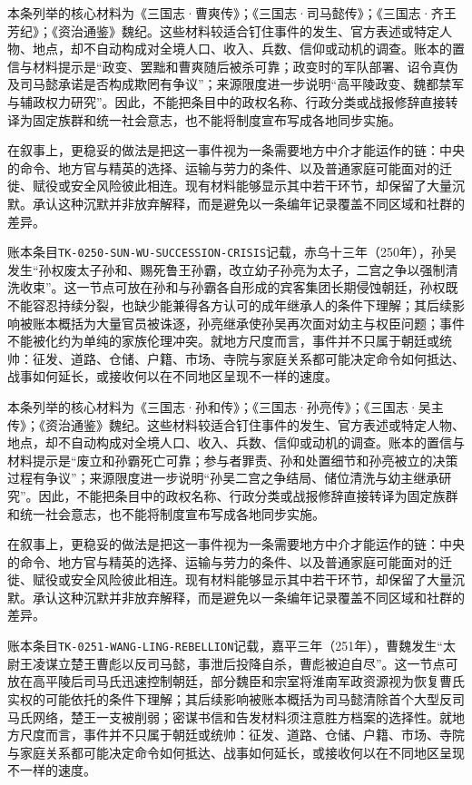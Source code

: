 本条列举的核心材料为《三国志·曹爽传》；《三国志·司马懿传》；《三国志·齐王芳纪》；《资治通鉴》魏纪。这些材料较适合钉住事件的发生、官方表述或特定人物、地点，却不自动构成对全境人口、收入、兵数、信仰或动机的调查。账本的置信与材料提示是“政变、罢黜和曹爽随后被杀可靠；政变时的军队部署、诏令真伪及司马懿承诺是否构成欺罔有争议”；来源限度进一步说明“高平陵政变、魏都禁军与辅政权力研究”。因此，不能把条目中的政权名称、行政分类或战报修辞直接转译为固定族群和统一社会意志，也不能将制度宣布写成各地同步实施。

在叙事上，更稳妥的做法是把这一事件视为一条需要地方中介才能运作的链：中央的命令、地方官与精英的选择、运输与劳力的条件、以及普通家庭可能面对的迁徙、赋役或安全风险彼此相连。现有材料能够显示其中若干环节，却保留了大量沉默。承认这种沉默并非放弃解释，而是避免以一条编年记录覆盖不同区域和社群的差异。

账本条目\texttt{TK-0250-SUN-WU-SUCCESSION-CRISIS}记载，赤乌十三年（250年），孙吴发生“孙权废太子孙和、赐死鲁王孙霸，改立幼子孙亮为太子，二宫之争以强制清洗收束”。这一节点可放在孙和与孙霸各自形成的宾客集团长期侵蚀朝廷，孙权既不能容忍持续分裂，也缺少能兼得各方认可的成年继承人的条件下理解；其后续影响被账本概括为大量官员被诛逐，孙亮继承使孙吴再次面对幼主与权臣问题；事件不能被化约为单纯的家族伦理冲突。就地方尺度而言，事件并不只属于朝廷或统帅：征发、道路、仓储、户籍、市场、寺院与家庭关系都可能决定命令如何抵达、战事如何延长，或接收何以在不同地区呈现不一样的速度。

本条列举的核心材料为《三国志·孙和传》；《三国志·孙亮传》；《三国志·吴主传》；《资治通鉴》魏纪。这些材料较适合钉住事件的发生、官方表述或特定人物、地点，却不自动构成对全境人口、收入、兵数、信仰或动机的调查。账本的置信与材料提示是“废立和孙霸死亡可靠；参与者罪责、孙和处置细节和孙亮被立的决策过程有争议”；来源限度进一步说明“孙吴二宫之争结局、储位清洗与幼主继承研究”。因此，不能把条目中的政权名称、行政分类或战报修辞直接转译为固定族群和统一社会意志，也不能将制度宣布写成各地同步实施。

在叙事上，更稳妥的做法是把这一事件视为一条需要地方中介才能运作的链：中央的命令、地方官与精英的选择、运输与劳力的条件、以及普通家庭可能面对的迁徙、赋役或安全风险彼此相连。现有材料能够显示其中若干环节，却保留了大量沉默。承认这种沉默并非放弃解释，而是避免以一条编年记录覆盖不同区域和社群的差异。

账本条目\texttt{TK-0251-WANG-LING-REBELLION}记载，嘉平三年（251年），曹魏发生“太尉王凌谋立楚王曹彪以反司马懿，事泄后投降自杀，曹彪被迫自尽”。这一节点可放在高平陵后司马氏迅速控制朝廷，部分魏臣和宗室将淮南军政资源视为恢复曹氏实权的可能依托的条件下理解；其后续影响被账本概括为司马懿清除首个大型反司马氏网络，楚王一支被削弱；密谋书信和告发材料须注意胜方档案的选择性。就地方尺度而言，事件并不只属于朝廷或统帅：征发、道路、仓储、户籍、市场、寺院与家庭关系都可能决定命令如何抵达、战事如何延长，或接收何以在不同地区呈现不一样的速度。

